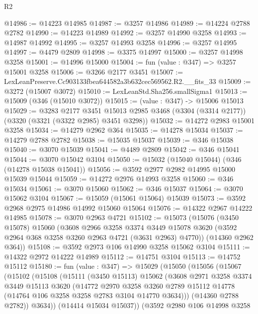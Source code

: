 \begin{lexlean}{R2}
\begin{coremodule}
@14986 := @14223 @14985
@14987 := @3257 @14986
@14989 := @14224 @2788 @2782
@14990 := @14223 @14989
@14992 := @3257 @14990 @3258
@14993 := @14987 @14992
@14995 := @3257 @14993 @3258
@14996 := @3257 @14995
@14997 := @4479 @2809
@14998 := @3375 @14997
@15000 := @3257 @14998 @3258
@15001 := @14996 @15000
@15004 := fun (value : @347) => @3257 @15001 @3258
@15006 := @3266 @2177 @3451
@15007 := LexLeanPreserve.Cc903133fbea644582a3b632cec569562.R2.__fits_33
@15009 := @3272 (@15007 @3072)
@15010 := LexLeanStd.Sha256.smallSigma1
@15013 := @15009 (@346 (@15010 @3072))
@15015 := (value : @347) -> @15006 @15013
@15029 := @3283
    @2177
    @3451
    @15013
    @2985
    @3468
    (@3304 (@3314 @2177))
    (@3320 (@3321 (@3322 @2985) @3451 @3298))
@15032 := @14272 @2983 @15001 @3258
@15034 := @14279 @2962 @364
@15035 := @14278 @15034
@15037 := @14279 @2788 @2782
@15038 := @15035 @15037
@15039 := @346 @15038
@15040 := @3070 @15039
@15041 := @4489 @2809
@15042 := @346 @15041
@15044 := @3070 @15042 @3104
@15050 := @15032 (@15040 @15044) (@346 (@14278 @15038 @15041))
@15056 := @3592 @2977 @2982 @14995 @15000 @15039 @15044
@15059 := @14272 @2976 @14993 @3258
@15060 := @346 @15034
@15061 := @3070 @15060
@15062 := @346 @15037
@15064 := @3070 @15062 @3104
@15067 := @15059 (@15061 @15064) @15039
@15073 := @3592 @2968 @2975 @14986 @14992 @15060 @15064
@15076 := @14322 @2967 @14222 @14985
@15078 := @3070 @2963 @4721
@15102 := @15073
    (@15076
      (@3450 @15078)
      @15060
      (@3608
        @2966
        @3258
        @3374
        @3449
        @15078
        @3620
        (@3592 @2964 @368 @3258 @3260 @2963 @4721 (@3631 @2963) @4770))
      (@14360 @2962 @364))
@15108 := @3592 @2973 @106 @14990 @3258 @15062 @3104
@15111 := @14322 @2972 @14222 @14989
@15112 := @14751 @3104
@15113 := @14752 @15112
@15180 := fun (value : @347) =>
  @15029
    (@15050
      (@15056
        (@15067
          (@15102
            (@15108
              (@15111
                (@3450 @15113)
                @15062
                (@3608
                  @2971
                  @3258
                  @3374
                  @3449
                  @15113
                  @3620
                  (@14772
                    @2970
                    @3258
                    @3260
                    @2789
                    @15112
                    @14778
                    (@14764 @106 @3258 @3258 @2783 @3104 @14770 @3634)))
                (@14360 @2788 @2782))
              @3634))
          (@14414 @15034 @15037))
        (@3592
          @2980
          @106
          @14998
          @3258

\end{coremodule}
\end{lexlean}
